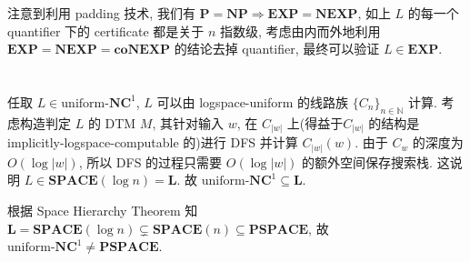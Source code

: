 \documentclass[8pt]{article}
\theoremstyle{compact}
\begin{document}
注意到利用 padding 技术, 我们有 $\textbf{P} = \textbf{NP} \Rightarrow \textbf{EXP} = \textbf{NEXP}$, 如上 $L$ 的每一个 quantifier 下的 certificate 都是关于 $n$ 指数级, 考虑由内而外地利用 $\textbf{EXP} = \textbf{NEXP} = \textbf{coNEXP}$ 的结论去掉 quantifier, 最终可以验证 $L \in \textbf{EXP}$.

\section{}
任取 $L \in \text{uniform-}\textbf{NC}^1$, $L$ 可以由 logspace-uniform 的线路族 $\{C_n\}_{n \in \mathbb N}$ 计算. 考虑构造判定 $L$ 的 DTM $M$, 其针对输入 $w$, 在 $C_{|w|}$ 上(得益于$C_{|w|}$ 的结构是 implicitly-logspace-computable 的)进行 DFS 并计算 $C_{|w|}(w)$. 由于 $C_w$ 的深度为 $O(\log |w|)$, 所以 DFS 的过程只需要 $O(\log |w|)$ 的额外空间保存搜索栈. 这说明 $L \in \textbf{SPACE}(\log n) = \textbf{L}$. 故 $\text{uniform-}\textbf{NC}^1 \subseteq \textbf{L}$.

根据 Space Hierarchy Theorem 知 $\textbf{L} = \textbf{SPACE}(\log n) \subsetneq \textbf{SPACE}(n) \subseteq \textbf{PSPACE}$, 故 $\text{uniform-}\textbf{NC}^1 \neq \textbf{PSPACE}$.
\end{document}
